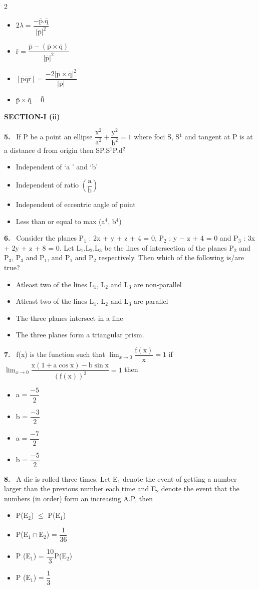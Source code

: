 \documentclass[10pt]{extarticle}
\newcommand{\sect}[1]{\par\smallskip\noindent\textbf{#1}\par}
\newcommand{\qn}[1]{\par\smallskip\noindent\textbf{#1.}~}
\newenvironment{qoptions}{\begin{itemize}[leftmargin=1.8em,itemsep=1pt,topsep=2pt,label={}]}{\end{itemize}}
\newcommand{\opt}[2]{\item[(#1)] #2}
\begin{document}
\begin{multicols}{2}
\begin{qoptions}
\opt{A}{$2\lambda=\dfrac{-\bar{\mathrm p}.\bar{\mathrm q}}{|\bar{\mathrm p}|^2}$}
\opt{B}{$\bar{\mathrm r}=\dfrac{\bar{\mathrm p}-(\bar{\mathrm p}\times\bar{\mathrm q})}{|\bar{\mathrm p}|^2}$}
\opt{C}{$[\bar{\mathrm p}\bar{\mathrm q}\bar{\mathrm r}]=\dfrac{-2|\bar{\mathrm p}\times\bar{\mathrm q}|^2}{|\bar{\mathrm p}|}$}
\opt{D}{$\bar{\mathrm p}\times\bar{\mathrm q}=\bar 0$}
\end{qoptions}
\sect{SECTION-I (ii)}
\qn{5} If P be a point an ellipse $\dfrac{\mathrm x^2}{\mathrm a^2}+\dfrac{\mathrm y^2}{\mathrm b^2}=1$ where foci S, S$^1$ and tangent at P is at a distance d from origin then SP.S$^1$P.d$^2$
\begin{qoptions}
\opt{A}{Independent of `a ' and `b'}
\opt{B}{Independent of ratio $\left(\dfrac{\mathrm a}{\mathrm b}\right)$}
\opt{C}{Independent of eccentric angle of point}
\opt{D}{Less than or equal to max (a$^4$, b$^4$)}
\end{qoptions}
\qn{6} Consider the planes P$_1$ : 2x + y + z + 4 = 0, P$_2$ : y $-$ z + 4 = 0 and P$_3$ : 3x + 2y + z + 8 = 0. Let L$_1$,L$_2$,L$_3$ be the lines of intersection of the planes P$_2$ and P$_3$, P$_3$ and P$_1$, and P$_1$ and P$_2$ respectively. Then which of the following is/are true?
\begin{qoptions}
\opt{A}{Atleast two of the lines L$_1$, L$_2$ and L$_3$ are non-parallel}
\opt{B}{Atleast two of the lines L$_1$, L$_2$ and L$_3$ are parallel}
\opt{C}{The three planes intersect in a line}
\opt{D}{The three planes form a triangular prism.}
\end{qoptions}
\qn{7} f(x) is the function such that $\displaystyle\lim_{x\to0}\dfrac{\mathrm f(\mathrm x)}{\mathrm x}=1$ if $\displaystyle\lim_{x\to0}\dfrac{\mathrm x(1+\mathrm a\cos\mathrm x)-\mathrm b\sin\mathrm x}{(\mathrm f(\mathrm x))^3}=1$ then
\begin{qoptions}
\opt{A}{a = $\dfrac{-5}{2}$}
\opt{B}{b = $\dfrac{-3}{2}$}
\opt{C}{a = $\dfrac{-7}{2}$}
\opt{D}{b = $\dfrac{-5}{2}$}
\end{qoptions}
\qn{8} A die is rolled three times. Let E$_1$ denote the event of getting a number larger than the previous number each time and E$_2$ denote the event that the numbers (in order) form an increasing A.P, then
\begin{qoptions}
\opt{A}{P(E$_2$) $\le$ P(E$_1$)}
\opt{B}{P(E$_1\cap$E$_2$) = $\dfrac1{36}$}
\opt{C}{P (E$_1$) = $\dfrac{10}{3}$P(E$_2$)}
\opt{D}{P (E$_1$) = $\dfrac13$}
\end{qoptions}

\end{multicols}
\end{document}
